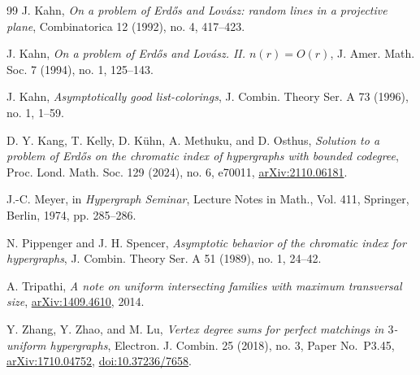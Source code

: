 \documentclass[11pt]{amsart}
\theoremstyle{remark}
\begin{document}
\begin{thebibliography}{99}
J. Kahn,
\emph{On a problem of Erd\H{o}s and Lov\'asz: random lines in a projective
plane},
Combinatorica 12 (1992), no. 4, 417--423.

J. Kahn,
\emph{On a problem of Erd\H{o}s and Lov\'asz. II. $n(r)=O(r)$},
J. Amer. Math. Soc. 7 (1994), no. 1, 125--143.

J. Kahn,
\emph{Asymptotically good list-colorings},
J. Combin. Theory Ser. A 73 (1996), no. 1, 1--59.

D. Y. Kang, T. Kelly, D. K\"uhn, A. Methuku, and D. Osthus,
\emph{Solution to a problem of Erd\H{o}s on the chromatic index of hypergraphs
with bounded codegree},
Proc. Lond. Math. Soc. 129 (2024), no. 6, e70011,
\href{https://arxiv.org/abs/2110.06181}{arXiv:2110.06181}.

J.-C. Meyer,
in \emph{Hypergraph Seminar},
Lecture Notes in Math., Vol. 411,
Springer, Berlin, 1974, pp. 285--286.

N. Pippenger and J. H. Spencer,
\emph{Asymptotic behavior of the chromatic index for hypergraphs},
J. Combin. Theory Ser. A 51 (1989), no. 1, 24--42.

A. Tripathi,
\emph{A note on uniform intersecting families with maximum transversal size},
\href{https://arxiv.org/abs/1409.4610}{arXiv:1409.4610}, 2014.

Y. Zhang, Y. Zhao, and M. Lu,
\emph{Vertex degree sums for perfect matchings in $3$-uniform hypergraphs},
Electron. J. Combin. 25 (2018), no. 3, Paper No.\ P3.45,
\href{https://arxiv.org/abs/1710.04752}{arXiv:1710.04752},
\href{https://doi.org/10.37236/7658}{doi:10.37236/7658}.

\end{thebibliography}
\end{document}
